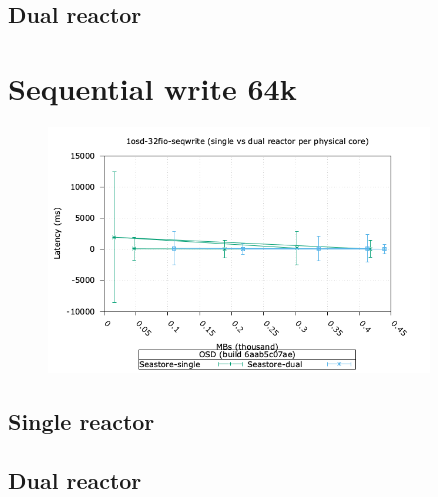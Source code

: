 \subsection{Dual reactor}

\pagebreak

\section{Sequential write 64k}

\begin{figure}[ht]
  \centering
  \includegraphics[width=0.9\textwidth]{seastore_1osd_32fio_seqwrite_iops_vs_lat.png}
\end{figure}

%
\subsection{Single reactor}

\subsection{Dual reactor}



